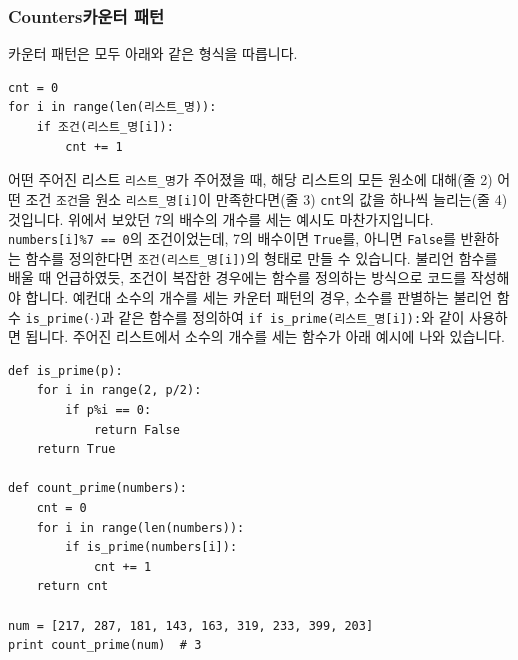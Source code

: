 \documentclass[../main.tex]{subfiles}
\begin{document}
\subsubsection{Counters카운터 패턴}
카운터 패턴은 모두 아래와 같은 형식을 따릅니다.
\begin{verbatim}
cnt = 0
for i in range(len(리스트_명)):
    if 조건(리스트_명[i]):
        cnt += 1
\end{verbatim}
어떤 주어진 리스트 \texttt{리스트\_명}가 주어졌을 때, 해당 리스트의 모든 원소에 대해(줄 2) 어떤 조건 \texttt{조건}을 원소 \texttt{리스트\_명[i]}이 만족한다면(줄 3) \texttt{cnt}의 값을 하나씩 늘리는(줄 4) 것입니다.
위에서 보았던 7의 배수의 개수를 세는 예시도 마찬가지입니다.
\texttt{numbers[i]\%7 == 0}의 조건이었는데, 7의 배수이면 \texttt{True}를, 아니면 \texttt{False}를 반환하는 함수를 정의한다면 \texttt{조건(리스트\_명[i])}의 형태로 만들 수 있습니다.
불리언 함수를 배울 때 언급하였듯, 조건이 복잡한 경우에는 함수를 정의하는 방식으로 코드를 작성해야 합니다.
예컨대 소수의 개수를 세는 카운터 패턴의 경우, 소수를 판별하는 불리언 함수 \texttt{is\_prime($\cdot$)}과 같은 함수를 정의하여 \texttt{if is\_prime(리스트\_명[i]):}와 같이 사용하면 됩니다.
주어진 리스트에서 소수의 개수를 세는 함수가 아래 예시에 나와 있습니다.
\begin{verbatim}
def is_prime(p):
    for i in range(2, p/2):
        if p%i == 0:
            return False
    return True

def count_prime(numbers):
    cnt = 0
    for i in range(len(numbers)):
        if is_prime(numbers[i]):
            cnt += 1
    return cnt

num = [217, 287, 181, 143, 163, 319, 233, 399, 203]
print count_prime(num)  # 3
\end{verbatim}
\end{document}

